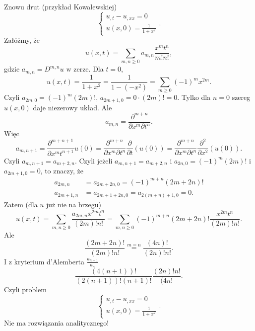 \documentclass[../main.tex]{subfiles}
\begin{document}
\begin{przyklad}
		Znowu drut (przykład Kowalewskiej)
		\[
		\begin{cases}
				u_{,t} - u_{,x x} = 0\\
				u(x,0) = \frac{1}{1+x^2}
		\end{cases}
		.\]
		Załóżmy, że
		\[
				u(x,t) = \sum_{m,n\ge 0} a_{m,n} \frac{x^mt^n}{m!n!}
		,\]
		gdzie $a_{m,n} = D^{m,n}u$ w zerze. Dla $t = 0$,
		\[
				u(x,t) = \frac{1}{1+x^2} = \frac{1}{1-(-x^2)} = \sum_{m\ge 0} (-1)^m x^{2m}
		.\]
		Czyli $a_{2m,0} = (-1)^m(2m)!$, $a_{2m+1,0} = 0 \cdot (2m)! = 0$. Tylko dla $n=0$ szereg $u(x,0)$ daje niezerowy układ. Ale
		\[
				a_{m,n} = \frac{\partial^{m+n}}{\partial x^{m}\partial t^n}
		.\]
		Więc
		\[
				a_{m,n+1} = \frac{\partial ^{m+n+1}}{\partial x^m t ^{n+1}} u(0) = \frac{\partial ^{m+n}}{\partial x^m \partial t^n} \frac{\partial }{\partial t} \left( u(0) \right) =\frac{\partial ^{m+n}}{\partial x^m \partial t^n} \frac{\partial^2 }{\partial x^2} \left( u(0) \right)
		.\]
		Czyli $a_{m,n+1} = a_{m+2,n}$. Czyli jeżeli $a_{m,n+1} = a_{m+2,n}$ i $a_{2n,0} = (-1)^m (2m)!$ i $a_{2m+1,0} = 0$, to znaczy, że
		\begin{align*}
				a_{2m,n} &= a_{2m+2n,0} = (-1)^{m+n}(2m+2n)!\\
				a_{2m+1,n} &= a_{2m+1+2n,0} = a_{2(m+n)+1,0} = 0
		.\end{align*}
		Zatem (dla $u$ już nie na brzegu)
\[
		u(x,t) = \sum_{m,n\ge 0} \frac{a_{2m,n}x^{2m}t^n}{(2m)!n!} = \sum_{m,n\ge 0} (-1)^{m+n}(2m+2n)! \frac{x^{2m}t^n}{(2m)!n!}
.\]
Ale
\[
		\frac{(2m+2n)!}{(2m)!n!} \overset{m=n}{=} \frac{(4n)!}{(2n)!n!}
.\]
I z kryterium d'Alemberta $\frac{a_{n+1}}{a_n}$
\[
		\frac{(4(n+1))!}{(2(n+1))!(n+1)!} \frac{(2n)!n!}{(4n!}
.\]
Czyli problem
\[
\begin{cases}
		u_{,t} - u_{,x x} = 0\\
		u(x,0) = \frac{1}{1+x^2}
\end{cases}
.\]
Nie ma rozwiązania analitycznego!
\end{przyklad}
\end{document}
